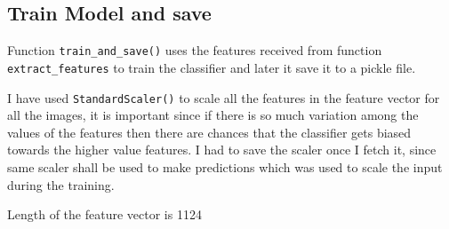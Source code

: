 \documentclass[11pt]{article}
\begin{document}
    \hypertarget{train-model-and-save}{%
\subsection{Train Model and save}\label{train-model-and-save}}

Function \texttt{train\_and\_save()} uses the features received from
function \texttt{extract\_features} to train the classifier and later it
save it to a pickle file.

I have used \texttt{StandardScaler()} to scale all the features in the
feature vector for all the images, it is important since if there is so
much variation among the values of the features then there are chances
that the classifier gets biased towards the higher value features. I had
to save the scaler once I fetch it, since same scaler shall be used to
make predictions which was used to scale the input during the training.

Length of the feature vector is 1124
\end{document}
